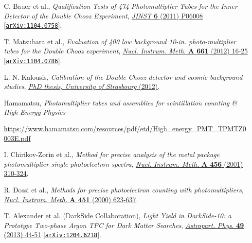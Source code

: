 \documentclass[a4paper,11pt]{article}
\begin{document}
\begin{thebibliography}{99}
 C. Bauer {et al.}, \emph{Qualification Tests of 474 Photomultiplier Tubes for the Inner Detector of the Double Chooz Experiment}, 
\href{https://iopscience.iop.org/article/10.1088/1748-0221/6/06/P06008}{\emph{JINST} {\bf 6} (2011) P06008}  [\href{https://arxiv.org/abs/1104.0758}{\texttt{arXiv:1104.0758}}]. 

 T. Matsubara {et al.}, \emph{Evaluation of 400 low background 10-in. photo-multiplier tubes for the Double Chooz experiment}, 
\href{https://www.sciencedirect.com/science/article/pii/S016890021101775X?via\%3Dihub}{\emph{Nucl. Instrum. Meth.} {\bf A 661} (2012) 16-25} 
[\href{https://arxiv.org/abs/1104.0786}{\texttt{arXiv:1104.0786}}]. 


 L. N. Kalousis, \emph{Calibration of the Double Chooz detector and cosmic background studies}, \href{http://inspirehep.net/record/1295030}{\emph{PhD thesis, University of Strasbourg} (2012)}. 
%



 Hamamatsu, \emph{Photomultiplier tubes and assemblies for scintillation counting \& High Energy Physics} %

\href{https://www.hamamatsu.com/resources/pdf/etd/High_energy_PMT_TPMTZ0003E.pdf}{https://www.hamamatsu.com/resources/pdf/etd/High\_energy\_PMT\_TPMTZ0003E.pdf}

 I. Chirikov-Zorin {et al.}, \emph{Method for precise analysis of the metal package photomultiplier single photoelectron spectra}, 
\href{https://www.sciencedirect.com/science/article/pii/S0168900200005933}{\emph{Nucl. Instrum. Meth.} {\bf A 456} (2001) 310-324}.


  R. Dossi {et al.}, \emph{Methods for precise photoelectron counting with photomultipliers}, 
\href{https://www.sciencedirect.com/science/article/pii/S0168900200003375}{\emph{Nucl. Instrum. Meth.} {\bf A 451} (2000) 623-637}. 

 T. Alexander {et al.} (DarkSide Collaboration), \emph{Light Yield in DarkSide-10: a Prototype Two-phase Argon TPC for Dark Matter Searches}, 
\href{https://www.sciencedirect.com/science/article/pii/S0927650513001254?via\%3Dihub}{\emph{Astropart. Phys.} {\bf 49} (2013) 44-51}  
[\href{https://arxiv.org/abs/1204.6218}{\texttt{arXiv:1204.6218}}]. 


\end{thebibliography}
\end{document}
